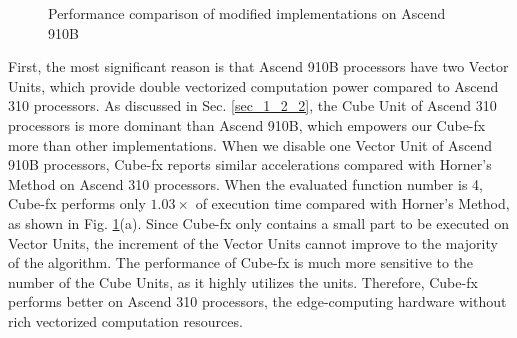 \begin{figure}[tbp]
  \caption{Performance comparison of modified implementations on Ascend 910B}
  \label{fig:disc}
  \end{figure}

First, the most significant reason is that Ascend 910B processors have two Vector Units, which provide double vectorized computation power compared to Ascend 310 processors. As discussed in Sec. \ref{sec_1_2_2}, the Cube Unit of Ascend 310 processors is more dominant than Ascend 910B, which empowers our Cube-fx more than other implementations. When we disable one Vector Unit of Ascend 910B processors, Cube-fx reports similar accelerations compared with Horner's Method on Ascend 310 processors. When the evaluated function number is 4, Cube-fx performs only $1.03\times$ of execution time compared with Horner's Method, as shown in Fig. \ref{fig:disc}(a). Since Cube-fx only contains a small part to be executed on Vector Units, the increment of the Vector Units cannot improve to the majority of the algorithm. The performance of Cube-fx is much more sensitive to the number of the Cube Units, as it highly utilizes the units. Therefore, Cube-fx performs better on Ascend 310 processors, the edge-computing hardware without rich vectorized computation resources.

